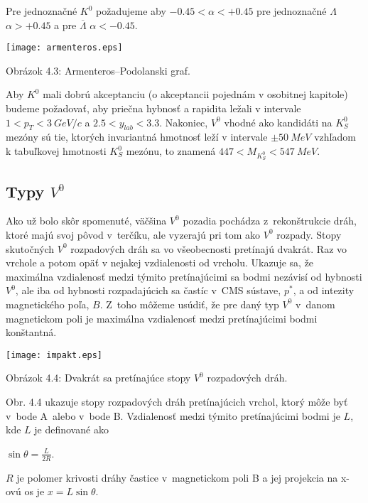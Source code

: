 Pre jednoznačné $K^{0}$ požadujeme aby $ -0.45< \alpha <+0.45$ pre
jednoznačné $\Lambda$ $\alpha >+0.45$ a pre $\overline{\Lambda}$ $\alpha
<-0.45$.

\begin{center}
  \texttt{[image: armenteros.eps]}
\end{center}
\begin{center}
  Obrázok 4.3: Armenteros--Podolanski graf.
\end{center}

Aby $K^{0}$ mali dobrú akceptanciu (o akceptancii pojednám v osobitnej
kapitole) budeme požadovať, aby priečna hybnosť a rapidita ležali v intervale
$1<p_{T}<3\: GeV/c$ a $2.5<y_{lab}<3.3$.   Nakoniec, $V^{0}$ vhodné ako
kandidáti na $K^{0}_{S}$ mezóny sú tie, ktorých invariantná hmotnosť leží v
intervale $\pm 50\: MeV$ vzhľadom k tabuľkovej  hmotnosti $K^{0}_{S}$ mezónu,
to znamená $447 < M_{K^{0}_{S}} < 547\: MeV$.

\subsection{Typy $V^{0}$}
Ako už bolo skôr spomenuté, väčšina $V^{0}$ pozadia pochádza
z~rekonštrukcie dráh, ktoré majú svoj pôvod v~terčíku, ale vyzerajú pri tom
ako $V^{0}$ rozpady. Stopy skutočných $V^{0}$ rozpadových dráh sa
vo všeobecnosti pretínajú dvakrát. Raz vo vrchole a potom opäť v nejakej
vzdialenosti od vrcholu. Ukazuje sa, že maximálna vzdialenosť medzi týmito
pretínajúcimi sa bodmi nezávisí od hybnosti $V^{0}$, ale iba od hybnosti
rozpadajúcich sa častíc v~CMS sústave, $p^{*}$, a od intezity magnetického
poľa, $B$. Z~toho môžeme usúdiť, že pre daný typ $V^{0}$ v~danom magnetickom
poli je maximálna vzdialenosť medzi pretínajúcimi bodmi konštantná.
\begin{center}
  \texttt{[image: impakt.eps]}
\end{center}
\begin{center}
  Obrázok 4.4: Dvakrát sa pretínajúce stopy  $V^{0}$ rozpadových dráh.
\end{center}

Obr. 4.4 ukazuje stopy rozpadových dráh pretínajúcich vrchol, ktorý môže byť
v~bode A~alebo v~bode B. Vzdialenosť medzi týmito pretínajúcimi bodmi je
$L$, kde $L$ je definované ako
\begin{center}
  $\sin\theta=\frac{L}{2R}$.
\end{center}
$R$ je polomer krivosti dráhy častice v~magnetickom poli B a jej projekcia na
x-ovú os je $x=L\sin\theta$.

